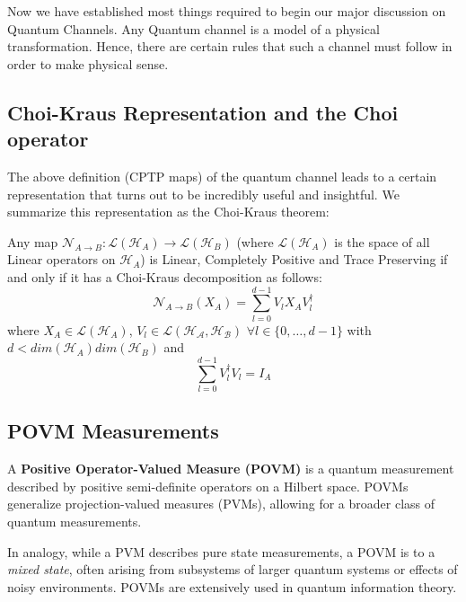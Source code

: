Now we have established most things required to begin our major discussion on Quantum Channels. Any
Quantum channel is a model of a physical transformation. Hence, there are certain rules that such a
channel must follow in order to make physical sense.

\subsection{Choi-Kraus Representation and the Choi operator}

The above definition (CPTP maps) of the quantum channel leads to a certain representation that turns
out to be incredibly useful and insightful. We summarize this representation as the Choi-Kraus theorem:
\begin{theorem}
    Any map $\mathcal{N}_{A\rightarrow B}:\mathcal{L}(\mathcal{H}_A) \rightarrow \mathcal{L}(\mathcal{H}_B)$
    (where $\mathcal{L}(\mathcal{H}_A)$ is the space of all Linear operators on $\mathcal{H}_A$) is Linear,
    Completely Positive and Trace Preserving if and only if it has a Choi-Kraus decomposition as follows:
    \begin{equation}
        \mathcal{N}_{A \rightarrow B}(X_A) = \displaystyle\sum_{l=0}^{d-1} V_l X_A V_l^\dagger
    \end{equation}
    where $X_A \in \mathcal{L}(\mathcal{H}_A)$, $V_l \in \mathcal{L}(\mathcal{H_A}, \mathcal{H_B})$ 
    $\forall l \in \{0,\dots,d-1\}$ with $d < dim(\mathcal{H}_A)dim(\mathcal{H}_B)$ and
    \begin{equation}
        \displaystyle\sum_{l=0}^{d-1} V_l^\dagger V_l = I_A
    \end{equation}
\end{theorem}

\renewcommand{\pageauthor}{Yash Seri}

\subsection{POVM Measurements}
A \textbf{Positive Operator-Valued Measure (POVM)} is a quantum measurement described by positive semi-definite operators on a Hilbert space. POVMs generalize projection-valued measures (PVMs), allowing for a broader class of quantum measurements. 

In analogy, while a PVM describes pure state measurements, a POVM is to a \emph{mixed state}, often arising from subsystems of larger quantum systems or effects of noisy environments. POVMs are extensively used in quantum information theory.

